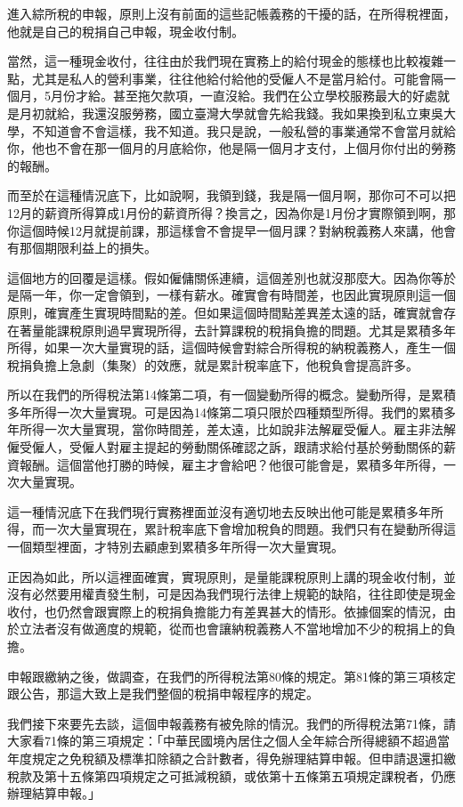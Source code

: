 \documentclass[]{ctexbook}
\begin{document}
進入綜所稅的申報，原則上沒有前面的這些記帳義務的干擾的話，在所得稅裡面，他就是自己的稅捐自己申報，現金收付制。

當然，這一種現金收付，往往由於我們現在實務上的給付現金的態樣也比較複雜一點，尤其是私人的營利事業，往往他給付給他的受僱人不是當月給付。可能會隔一個月，5月份才給。甚至拖欠款項，一直沒給。我們在公立學校服務最大的好處就是月初就給，我還沒服勞務，國立臺灣大學就會先給我錢。我如果換到私立東吳大學，不知道會不會這樣，我不知道。我只是說，一般私營的事業通常不會當月就給你，他也不會在那一個月的月底給你，他是隔一個月才支付，上個月你付出的勞務的報酬。

而至於在這種情況底下，比如說啊，我領到錢，我是隔一個月啊，那你可不可以把12月的薪資所得算成1月份的薪資所得？換言之，因為你是1月份才實際領到啊，那你這個時候12月就提前課，那這樣會不會提早一個月課？對納稅義務人來講，他會有那個期限利益上的損失。

這個地方的回覆是這樣。假如僱傭關係連續，這個差別也就沒那麼大。因為你等於是隔一年，你一定會領到，一樣有薪水。確實會有時間差，也因此實現原則這一個原則，確實產生實現時間點的差。但如果這個時間點差異差太遠的話，確實就會存在著量能課稅原則過早實現所得，去計算課稅的稅捐負擔的問題。尤其是累積多年所得，如果一次大量實現的話，這個時候會對綜合所得稅的納稅義務人，產生一個稅捐負擔上急劇（集聚）的效應，就是累計稅率底下，他稅負會提高許多。

所以在我們的所得稅法第14條第二項，有一個變動所得的概念。變動所得，是累積多年所得一次大量實現。可是因為14條第二項只限於四種類型所得。我們的累積多年所得一次大量實現，當你時間差，差太遠，比如說非法解雇受僱人。雇主非法解僱受僱人，受僱人對雇主提起的勞動關係確認之訴，跟請求給付基於勞動關係的薪資報酬。這個當他打勝的時候，雇主才會給吧？他很可能會是，累積多年所得，一次大量實現。

這一種情況底下在我們現行實務裡面並沒有適切地去反映出他可能是累積多年所得，而一次大量實現在，累計稅率底下會增加稅負的問題。我們只有在變動所得這一個類型裡面，才特別去顧慮到累積多年所得一次大量實現。

正因為如此，所以這裡面確實，實現原則，是量能課稅原則上講的現金收付制，並沒有必然要用權責發生制，可是因為我們現行法律上規範的缺陷，往往即使是現金收付，也仍然會跟實際上的稅捐負擔能力有差異甚大的情形。依據個案的情況，由於立法者沒有做適度的規範，從而也會讓納稅義務人不當地增加不少的稅捐上的負擔。

申報跟繳納之後，做調查，在我們的所得稅法第80條的規定。第81條的第三項核定跟公告，那這大致上是我們整個的稅捐申報程序的規定。

我們接下來要先去談，這個申報義務有被免除的情況。我們的所得稅法第71條，請大家看71條的第三項規定：「中華民國境內居住之個人全年綜合所得總額不超過當年度規定之免稅額及標準扣除額之合計數者，得免辦理結算申報。但申請退還扣繳稅款及第十五條第四項規定之可抵減稅額，或依第十五條第五項規定課稅者，仍應辦理結算申報。」
\end{document}
